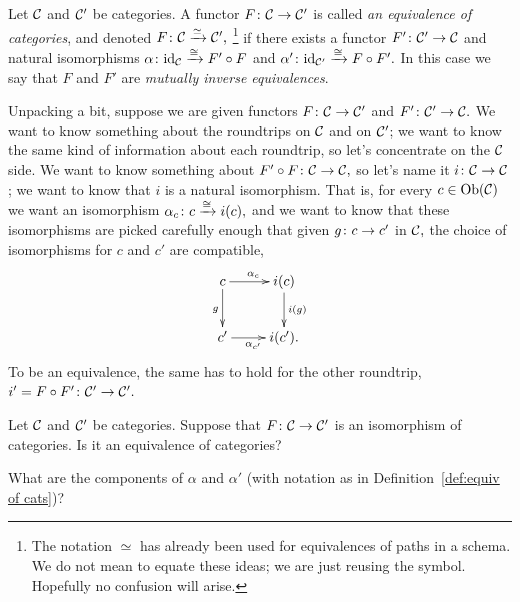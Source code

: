 \documentclass[CT4S-EN-RU]{subfiles}
\begin{document}
\begin{blockRUS}
\end{blockRUS}

\begin{definitionENG}\label{def:equiv of cats}
Let $\mathcal{C}$ and $\mathcal{C}'$ be categories. A functor $F\colon\mathcal{C}\rightarrow\mathcal{C}'$ is called {\em an equivalence of categories}, and denoted $F\colon\mathcal{C}\xrightarrow{\simeq}\mathcal{C}',$
\footnote{The notation $\simeq$ has already been used for equivalences of paths in a schema. We do not mean to equate these ideas; we are just reusing the symbol. Hopefully no confusion will arise.}
 if there exists a functor $F'\colon\mathcal{C}'\rightarrow\mathcal{C}$ and natural isomorphisms $\alpha\colon \textnormal{id}_\mathcal{C}\xrightarrow{\cong}F'\circ F$ and $\alpha'\colon\textnormal{id}_{\mathcal{C}'}\xrightarrow{\cong}F\circ F'.$ In this case we say that $F$ and $F'$ are {\em mutually inverse equivalences}.
\end{definitionENG}

\begin{definitionRUS}\label{def:equiv of cats}
\end{definitionRUS}

\begin{blockENG}
Unpacking a bit, suppose we are given functors $F\colon\mathcal{C}\rightarrow\mathcal{C}'$ and $F'\colon\mathcal{C}'\rightarrow\mathcal{C}.$ We want to know something about the roundtrips on $\mathcal{C}$ and on $\mathcal{C}'$; we want to know the same kind of information about each roundtrip, so let's concentrate on the $\mathcal{C}$ side. We want to know something about $F'\circ F\colon\mathcal{C}\rightarrow\mathcal{C},$ so let's name it $i\colon\mathcal{C}\rightarrow\mathcal{C}$; we want to know that $i$ is a natural isomorphism. That is, for every $c\in\textnormal{Ob}(\mathcal{C})$ we want an isomorphism $\alpha_c\colon c\xrightarrow{\cong} i(c),$ and we want to know that these isomorphisms are picked carefully enough that given $g\colon c\rightarrow c'$ in $\mathcal{C},$ the choice of isomorphisms for $c$ and $c'$ are compatible,
$$\xymatrix{c\ar[r]^{\alpha_c}\ar[d]_g&i(c)\ar[d]^{i(g)}\\c'\ar[r]_{\alpha_{c'}}&i(c').}$$
To be an equivalence, the same has to hold for the other roundtrip, $i'=F\circ F'\colon\mathcal{C}'\rightarrow\mathcal{C}'.$
\end{blockENG}

\begin{blockRUS}
\end{blockRUS}

\begin{exerciseENG}
Let $\mathcal{C}$ and $\mathcal{C}'$ be categories. Suppose that $F\colon\mathcal{C}\rightarrow\mathcal{C}'$ is an isomorphism of categories.
\sexc Is it an equivalence of categories?
\item What are the components of $\alpha$ and $\alpha'$ (with notation as in Definition~\ref{def:equiv of cats})?
\endsexc
\end{exerciseENG}
\end{document}
